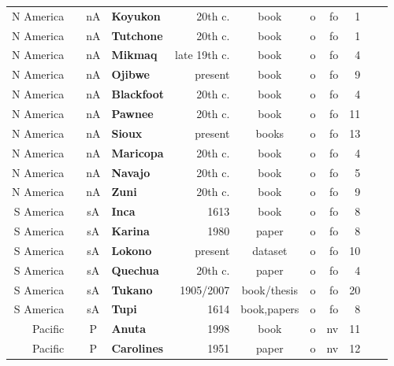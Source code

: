 \documentclass[10pt]{article}
\begin{document}
\begin{table}[htbp]
{{\begin{tabular}{rcclrcrrrrr}
N America	& 	& nA& \textbf{Koyukon}	& 20th c.		& book			& o	& fo	& 1		& \cite{miller1997stars} \\
N America	& 	& nA& \textbf{Tutchone}	& 20th c.		& book			& o	& fo	& 1		& \cite{miller1997stars} \\
N America	& 	& nA& \textbf{Mi{\textquotesingle}kmaq}& late 19th c.& book	& o	& fo	& 4		& \cite{miller1997stars} \\
N America	& 	& nA& \textbf{Ojibwe}		& present		& book			& o	& fo	& 9		& \cite{lee2014ojibwe,Stellarium} \\
N America	& 	& nA& \textbf{Blackfoot}& 20th c.		& book			& o	& fo	& 4		& \cite{miller1997stars} \\
N America	& 	& nA& \textbf{Pawnee}		& 20th c.		& book			& o	& fo	& 11		& \cite{miller1997stars} \\
N America	& 	& nA& \textbf{Sioux}		& present		& books			& o	& fo	& 13	& \cite{lee2014dlakota,miller1997stars,Stellarium} \\
N America	& 	& nA& \textbf{Maricopa}	& 20th c.		& book			& o	& fo	& 4		& \cite{miller1997stars} \\
N America	& 	& nA& \textbf{Navajo}		& 20th c.		& book			& o	& fo	& 5		& \cite{miller1997stars} \\
N America	& 	& nA& \textbf{Zuni}			& 20th c.		& book			& o	& fo	& 9		& \cite{miller1997stars} \\
\hline
%
S America	& 	& sA& \textbf{Inca}			& 1613			& book			& o	& fo	& 8	 	& \cite{lehmann1928coricancha} \\
S America	& 	& sA& \textbf{Kari{\textquotesingle}na}& 1980& paper		& o	& fo	& 8		& \cite{magana1982carib} \\
S America	& 	& sA& \textbf{Lokono}		& present		& dataset		& o	& fo	& 10	& \cite{rybka2018lokono,Stellarium} \\
S America	& 	& sA& \textbf{Quechua}	& 20th c.		& paper			& o	& fo	& 4		& \cite{urton1978beasts} \\
S America	& 	& sA& \textbf{Tukano}		& 1905/2007		& book/thesis	& o	& fo	& 20	& \cite{koch1905anfange,cardoso2007ceu,Stellarium} \\
S America	& 	& sA& \textbf{Tupi}			& 1614			& book,papers			& o	& fo	& 8		& \cite{abbeville1614histoire,magana1984tupi,afonso2013constelaccoes,Stellarium} \\
\hline
%
Pacific		& 	& P	& \textbf{Anuta}		& 1998			& book			& o	& nv	& 11	& \cite{feinberg1988polynesian,Stellarium} \\
Pacific		& 	& P	& \textbf{Carolines}& 1951			& paper			& o	& nv	& 12	& \cite{goodenough1951native,holton2015east} \\

\end{tabular}}}
\end{table}
\end{document}
